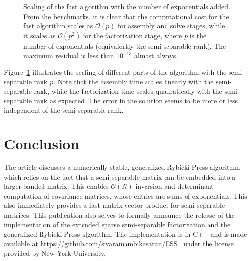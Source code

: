 \documentclass[times]{nlaauth}
\begin{document}
\begin{figure}[!htbp]
{}
\caption{Scaling of the fast algorithm with the number of exponentials added. From the benchmarks, it is clear that the computational cost for the fast algorithm scales as $\mathcal{O}(p)$ for assembly and solve stages, while it scales as $\mathcal{O}(p^2)$ for the factorization stage, where $p$ is the number of exponentials (equivalently the semi-separable rank). The maximum residual is less than $10^{-13}$ almost always.}
\label{figure_benchmark2}
\end{figure}

Figure~\ref{figure_benchmark2} illustrates the scaling of different parts of the algorithm  with the semi-separable rank $p$. Note that the assembly time scales linearly with the semi-separable rank, while the factorization time scales quadratically with the semi-separable rank as expected. The error in the solution seems to be more or less independent of the semi-separable rank.




\section{Conclusion}
The article discusses a numerically stable, generalized Rybicki Press algorithm, which relies on the fact that a semi-separable matrix can be embedded into a larger banded matrix. This enables $\mathcal{O}(N)$ inversion and determinant computation of covariance matrices, whose entries are sums of exponentials. This also immediately provides a fast matrix vector product for semi-separable matrices. This publication also serves to formally announce the release of the implementation of the extended sparse semi-separable factorization and the generalized Rybicki Press algorithm. The implementation is in C++ and is made available at \url{https://github.com/sivaramambikasaran/ESS}~\cite{ambikasaran2014ESS} under the license provided by New York University.
\end{document}

